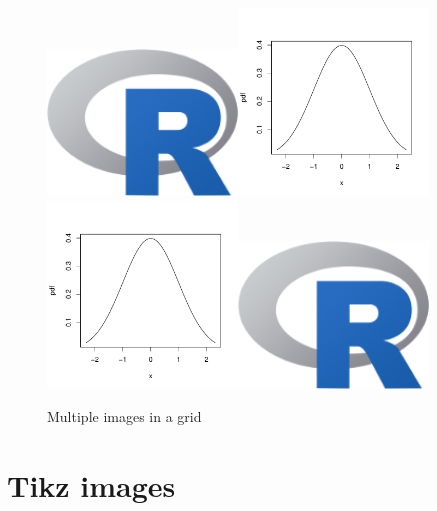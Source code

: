 \begin{figure}[htbp]
  \centering
  \includegraphics[width=0.45\textwidth]{Rlogo-5.png}\includegraphics[width=0.45\textwidth]{normal}
  \includegraphics[width=0.45\textwidth]{normal}\includegraphics[width=0.45\textwidth]{Rlogo-5.png}
  \caption{Multiple images in a grid}
  \label{fig:fourimages}
\end{figure}


\section{Tikz images}

